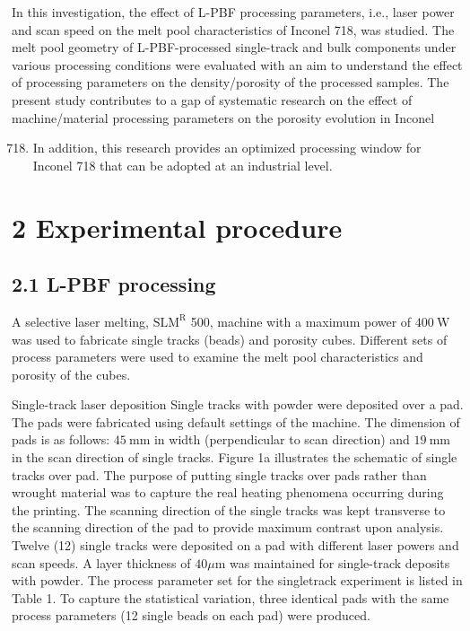\documentclass[10pt]{article}
\begin{document}
In this investigation, the effect of L-PBF processing parameters, i.e., laser power and scan speed on the melt pool characteristics of Inconel 718, was studied. The melt pool geometry of L-PBF-processed single-track and bulk components under various processing conditions were evaluated with an aim to understand the effect of processing parameters on the density/porosity of the processed samples. The present study contributes to a gap of systematic research on the effect of machine/material processing parameters on the porosity evolution in Inconel

\begin{enumerate}
  \setcounter{enumi}{717}
  \item In addition, this research provides an optimized processing window for Inconel 718 that can be adopted at an industrial level.
\end{enumerate}

\section*{2 Experimental procedure}
\subsection*{2.1 L-PBF processing}
A selective laser melting, $\mathrm{SLM}^{\mathrm{R}}$ 500, machine with a maximum power of $400 \mathrm{~W}$ was used to fabricate single tracks (beads) and porosity cubes. Different sets of process parameters were used to examine the melt pool characteristics and porosity of the cubes.

Single-track laser deposition Single tracks with powder were deposited over a pad. The pads were fabricated using default settings of the machine. The dimension of pads is as follows: $45 \mathrm{~mm}$ in width (perpendicular to scan direction) and $19 \mathrm{~mm}$ in the scan direction of single tracks. Figure 1a illustrates the schematic of single tracks over pad. The purpose of putting single tracks over pads rather than wrought material was to capture the real heating phenomena occurring during the printing. The scanning direction of the single tracks was kept transverse to the scanning direction of the pad to provide maximum contrast upon analysis. Twelve (12) single tracks were deposited on a pad with different laser powers and scan speeds. A layer thickness of $40 \mu \mathrm{m}$ was maintained for single-track deposits with powder. The process parameter set for the singletrack experiment is listed in Table 1. To capture the statistical variation, three identical pads with the same process parameters (12 single beads on each pad) were produced.
\end{document}

